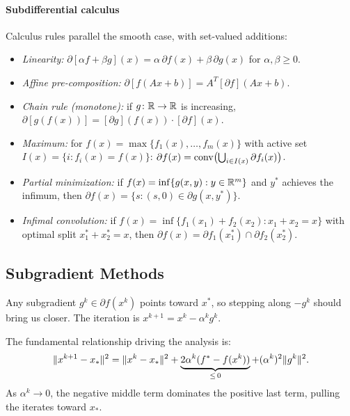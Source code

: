 \paragraph{Subdifferential calculus}

Calculus rules parallel the smooth case, with set-valued additions:
\begin{itemize}
	\item \textit{Linearity:} $\partial[\alpha f + \beta g](x) = \alpha\, \partial f(x) + \beta\, \partial g(x)$ for $\alpha, \beta \geq 0$.
	\item \textit{Affine pre-composition:} $\partial[f(Ax + b)] = A^T [\partial f](Ax + b)$.
	\item \textit{Chain rule (monotone):} if $g \colon \mathbb{R} \to \mathbb{R}$ is increasing, $\partial[g(f(x))] = [\partial g](f(x)) \cdot [\partial f](x)$.
	\item \textit{Maximum:} for $f(x) = \max\{f_1(x), \dots, f_m(x)\}$ with active set $I(x) = \{i : f_i(x) = f(x)\}$:
		$\partial f(x) = \operatorname{conv}\bigl(\bigcup_{i \in I(x)} \partial f_i(x)\bigr)$.
	\item \textit{Partial minimization:} if $f(x) = \inf\{g(x, y) : y \in \mathbb{R}^m\}$ and $y^*$ achieves the infimum, then $\partial f(x) = \{s : (s, 0) \in \partial g(x, y^*)\}$.
	\item \textit{Infimal convolution:} if $f(x) = \inf\{f_1(x_1) + f_2(x_2) : x_1 + x_2 = x\}$ with optimal split $x_1^* + x_2^* = x$, then $\partial f(x) = \partial f_1(x_1^*) \cap \partial f_2(x_2^*)$.
\end{itemize}


\subsection{Subgradient Methods}\label{ssec:subgradient-methods}

Any subgradient $g^k \in \partial f(x^k)$ points toward $x^*$, so stepping along $-g^k$ should bring us closer.
The iteration is $x^{k+1} = x^k - \alpha^k g^k$.

The fundamental relationship driving the analysis is:
\begin{equation}\label{eq:subgradient-fundamental}
	\lVert x^{k+1} - x_*\rVert^2
	= \lVert x^k - x_*\rVert^2
		+ \underbrace{2\alpha^k(f^* - f(x^k))}_{\leq\, 0}
		+ (\alpha^k)^2 \lVert g^k\rVert^2.
\end{equation}
As $\alpha^k \to 0$, the negative middle term dominates the positive last term, pulling the iterates toward $x_*$.

